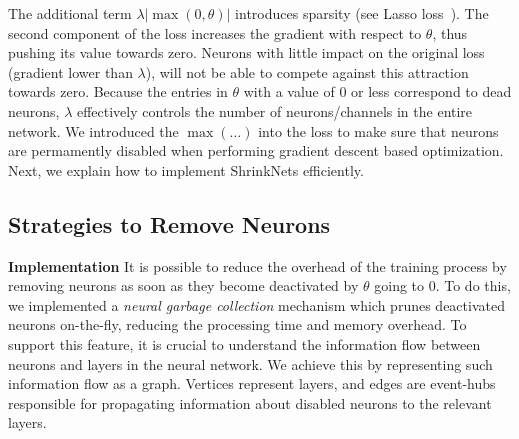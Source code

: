 The additional term $\lambda|\max(0, \theta)|$ introduces sparsity (see Lasso
loss~\cite{Tibshirani1996}). 
 The second component of the loss increases the gradient with respect to $\theta$, thus pushing its value towards zero. Neurons with little impact
on the original loss (gradient lower than $\lambda$), will not be able to
compete against this attraction towards zero. Because the entries in $\theta$
with a value of $0$ or less correspond to dead neurons, $\lambda$ effectively
controls the number of neurons/channels in the entire network. We introduced
the $\max(\dots)$ into the loss to make sure that neurons are permamently disabled
when performing gradient descent based optimization. Next, we
explain how to implement ShrinkNets efficiently.

\subsection{Strategies to Remove Neurons}

\textbf{Implementation}
It is possible to reduce the overhead of the training process by removing
neurons as soon as they become deactivated by $\theta$ going to 0.
To do this, we implemented a \emph{neural garbage collection} mechanism which
prunes deactivated neurons on-the-fly,  reducing the processing time
and memory overhead. To support this feature, it is crucial to understand the
information flow between neurons and layers in the neural network. We achieve
this by representing such information flow as a graph. Vertices represent layers,
and edges are event-hubs responsible for propagating information about disabled
neurons to the relevant layers.